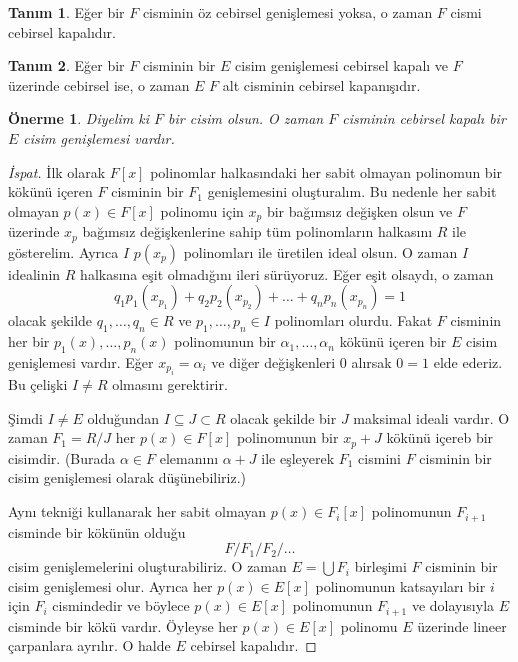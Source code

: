 \documentclass[draft]{article}
\newtheorem{prop}[thm]{Önerme}
\theoremstyle{definition}
\newtheorem{defn}{Tanım}[section]
\theoremstyle{remark}
\begin{document}
            \begin{defn}
                Eğer bir $F$ cisminin öz cebirsel genişlemesi yoksa, o zaman $F$ cismi cebirsel kapalıdır.
            \end{defn}
            
            \begin{defn}
                Eğer bir $F$ cisminin bir $E$ cisim genişlemesi cebirsel kapalı ve $F$ üzerinde cebirsel ise, o zaman $E$ $F$ alt cisminin cebirsel kapanışıdır.
            \end{defn}
            
            \begin{prop}
                Diyelim ki $F$ bir cisim olsun. O zaman $F$ cisminin cebirsel kapalı bir $E$ cisim genişlemesi vardır.
            \end{prop}
            
            \begin{proof}[İspat]
                İlk olarak $F[x]$ polinomlar halkasındaki her sabit olmayan polinomun bir kökünü içeren $F$ cisminin bir $F_1$ genişlemesini oluşturalım. Bu nedenle her sabit olmayan $p(x) \in F[x]$ polinomu için $x_p$ bir bağımsız değişken olsun ve $F$ üzerinde $x_p$ bağımsız değişkenlerine sahip tüm polinomların halkasını $R$ ile gösterelim. Ayrıca $I$ $p(x_p)$ polinomları ile üretilen ideal olsun. O zaman $I$ idealinin $R$ halkasına eşit olmadığını ileri sürüyoruz. Eğer eşit olsaydı, o zaman
                \begin{equation*}
                    q_1p_1(x_{p_1}) + q_2p_2(x_{p_2}) + \dots + q_np_n(x_{p_n}) = 1
                \end{equation*}
                olacak şekilde $q_1, \dots, q_n \in R$ ve $p_1, \dots, p_n \in I$ polinomları olurdu. Fakat $F$ cisminin her bir $p_1(x), \dots, p_n(x)$ polinomunun bir $\alpha_1, \dots, \alpha_n$ kökünü içeren bir $E$ cisim genişlemesi vardır. Eğer $x_{p_i} = \alpha_i$ ve diğer değişkenleri $0$ alırsak $0 = 1$ elde ederiz. Bu çelişki $I \neq R$ olmasını gerektirir.\par
                Şimdi $I \neq E$ olduğundan $I \subseteq J \subset R$ olacak şekilde bir $J$ maksimal ideali vardır. O zaman $F_1 = R / J$ her $p(x) \in F[x]$ polinomunun bir $x_p + J$ kökünü içereb bir cisimdir. (Burada $\alpha \in F$ elemanını $\alpha + J$ ile eşleyerek $F_1$ cismini $F$ cisminin bir cisim genişlemesi olarak düşünebiliriz.)\par
                Aynı tekniği kullanarak her sabit olmayan $p(x) \in F_i[x]$ polinomunun $F_{i + 1}$ cisminde bir kökünün olduğu
                \begin{equation*}
                    F / F_1 / F_2 / \dots
                \end{equation*}
                cisim genişlemelerini oluşturabiliriz. O zaman $E = \bigcup F_i$ birleşimi $F$ cisminin bir cisim genişlemesi olur. Ayrıca her $p(x) \in E[x]$ polinomunun katsayıları bir $i$ için $F_i$ cismindedir ve böylece $p(x) \in E[x]$ polinomunun $F_{i + 1}$ ve dolayısıyla $E$ cisminde bir kökü vardır. Öyleyse her $p(x) \in E[x]$ polinomu $E$ üzerinde lineer çarpanlara ayrılır. O halde $E$ cebirsel kapalıdır.
            \end{proof}
            
\end{document}
